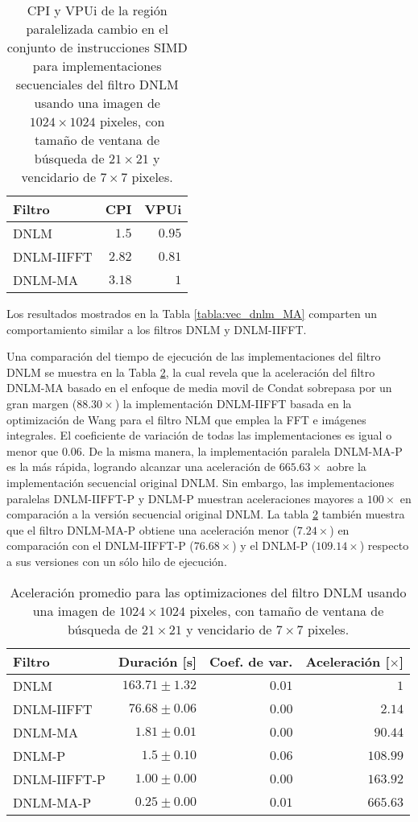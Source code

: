 \begin{table}
\protect\caption[Métricas CPI y VPUi de los filtros con 1 hilo]{CPI y VPUi de  la región paralelizada cambio en el conjunto de instrucciones SIMD para implementaciones secuenciales del filtro DNLM usando una imagen de  $1024 \times 1024$ pixeles, con tama\~no de ventana de búsqueda de $21 \times 21$ y vencidario de $7 \times 7$ pixeles. \label{tabla:vpui}}
\centering
\begin{tabular}{lrr}
Filtro  & CPI & VPUi \tabularnewline
\hline
DNLM & $1.5$ & $0.95$\tabularnewline
DNLM-IIFFT &$2.82$ & $0.81$  \tabularnewline
DNLM-MA &$3.18$&  $1$  \tabularnewline
\end{tabular}
\end{table}

Los resultados mostrados en la Tabla \ref{tabla:vec_dnlm_MA} comparten un comportamiento similar a los filtros DNLM y DNLM-IIFFT. 



Una comparación del tiempo de ejecución de las implementaciones del filtro DNLM se muestra en la Tabla \ref{tabla:speedup}, la cual revela que la aceleración del filtro DNLM-MA basado en el enfoque de media movil de Condat \cite{Condat2010} sobrepasa por un gran margen ($88.30\times$) la implementación DNLM-IIFFT \cite{CalderonRamirez2017} basada en la optimización de Wang para el filtro NLM \cite{wang2006fast} que emplea la FFT e imágenes integrales. El coeficiente de variación de todas las implementaciones es igual o menor que $0.06$. 
De la misma manera, la implementación paralela DNLM-MA-P es la más rápida, logrando alcanzar una aceleración de $665.63\times$ aobre la implementación secuencial original DNLM. Sin embargo, las implementaciones paralelas DNLM-IIFFT-P y DNLM-P muestran aceleraciones mayores a $100\times$ en comparación a la versión secuencial original DNLM.
La tabla \ref{tabla:speedup} también muestra que el filtro DNLM-MA-P obtiene una aceleración menor ($7.24\times$) en comparación con el DNLM-IIFFT-P ($76.68\times$) y el DNLM-P ($109.14\times$) respecto a sus versiones con un sólo hilo de ejecución.



\begin{table}
\protect\caption[Aceleración promedio de optimizaciones del filtro DNLM]{Aceleración promedio para las optimizaciones del filtro DNLM usando una imagen de  $1024 \times 1024$ pixeles, con tama\~no de ventana de búsqueda de $21 \times 21$ y vencidario de $7 \times 7$ pixeles. \label{tabla:speedup}}
\centering
\begin{tabular}{lrrr}
Filtro & Duración [s]& Coef. de var. & Aceleración [$\times$]\tabularnewline
\hline
DNLM & $163.71\pm1.32$ & $0.01$ & $1$\tabularnewline
DNLM-IIFFT & $76.68\pm0.06$ & $0.00$ & $2.14$\tabularnewline
DNLM-MA & $1.81\pm 0.01$ & $0.00$ & $90.44$ \tabularnewline
DNLM-P & $1.5\pm0.10$ & $0.06$ & $108.99$\tabularnewline
DNLM-IIFFT-P & $1.00\pm0.00$ & $0.00$ & $163.92$ \tabularnewline 
DNLM-MA-P & $\boldsymbol{0.25\pm0.00}$ & $\boldsymbol{0.01}$ &  $\boldsymbol{665.63}$\tabularnewline
\end{tabular}
\end{table}


